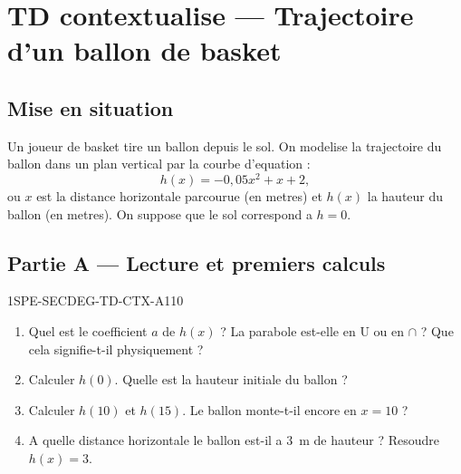 

\section*{TD contextualise — Trajectoire d'un ballon de basket}

\subsection*{Mise en situation}

Un joueur de basket tire un ballon depuis le sol. On modelise la trajectoire du ballon dans un plan vertical par la courbe d'equation :
\[
  h(x) = -0{,}05x^2 + x + 2,
\]
ou $x$ est la distance horizontale parcourue (en metres) et $h(x)$ la hauteur du ballon (en metres). On suppose que le sol correspond a $h = 0$.

\bigskip

\subsection*{Partie A — Lecture et premiers calculs}

\begin{exercice}{1SPE-SECDEG-TD-CTX-A}{1}{10}
\begin{enumerate}
  \item Quel est le coefficient $a$ de $h(x)$ ? La parabole est-elle en U ou en $\cap$ ? Que cela signifie-t-il physiquement ?
  \item Calculer $h(0)$. Quelle est la hauteur initiale du ballon ?
  \item Calculer $h(10)$ et $h(15)$. Le ballon monte-t-il encore en $x = 10$ ?
  \item A quelle distance horizontale le ballon est-il a $3$~m de hauteur ?
    Resoudre $h(x) = 3$.
\end{enumerate}
\end{exercice}


